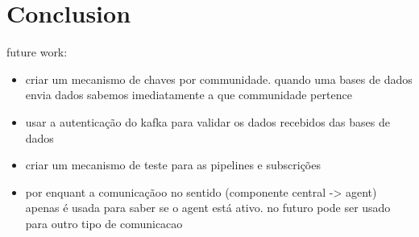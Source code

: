 \chapter{Conclusion}
\label{chapter:conclusion}

future work:
\begin{itemize}
    \item criar um mecanismo de chaves por communidade. quando uma bases de dados envia dados sabemos imediatamente a que communidade pertence
    \item usar a autenticação do kafka para validar os dados recebidos das bases de dados
    \item criar um mecanismo de teste para as pipelines e subscrições
    \item por enquant a comunicaçãoo no sentido (componente central -> agent) apenas é usada para saber se o agent está ativo. no futuro pode ser usado para outro tipo de comunicacao
\end{itemize}
